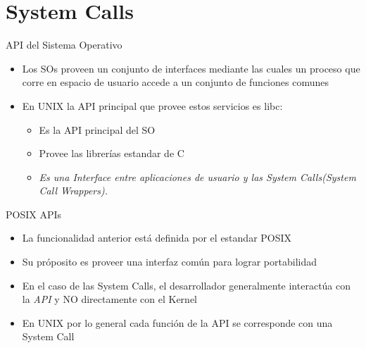 \section{System Calls}


\begin{frame}{API del Sistema Operativo}
  \begin{itemize}
  \item Los SOs proveen un conjunto de interfaces mediante las cuales un proceso que corre en espacio de usuario accede a un conjunto de funciones comunes
   \begin{center}
   \end{center}

  \item En UNIX la API principal que provee estos servicios es libc:
  \begin{itemize}
    \item Es la \alert{API} principal del SO
    \item Provee las librerías estandar de C
    \item \textit{Es una Interface entre aplicaciones de usuario y las \alert{System Calls}(System Call Wrappers).} 
      \end{itemize} 
  \end{itemize}
\end{frame}

\begin{frame}{POSIX APIs}
  \begin{itemize}
  \item La funcionalidad anterior está definida por el estandar POSIX
  \item Su próposito es proveer una interfaz común para lograr portabilidad
  \item En el caso de las System Calls, el desarrollador generalmente interactúa con la \textit{API} y NO directamente con el Kernel   
  \item En UNIX por lo general cada función de la \alert{API} se corresponde con una \alert{System Call}
  \end{itemize}
 \begin{center}
   \end{center}
\end{frame}

